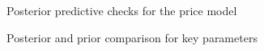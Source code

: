 \documentclass[
  letterpaper,
  DIV=11,
  numbers=noendperiod]{scrartcl}
\begin{document}
\begin{figure}


\caption{\label{fig-post-pred}Posterior predictive checks for the price
model}

\end{figure}%

\begin{figure}[H]


\caption{\label{fig-post-prior}Posterior and prior comparison for key
parameters}

\end{figure}%
\end{document}
